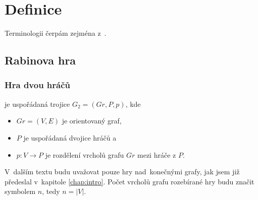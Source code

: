 \chapter{Definice} \label{chap:definitions}
Terminologii čerpám zejména z~\cite{Kretinsky2002,Horn2005,Piterman2006}.
\section{Rabinova hra}
\subsection{Hra dvou hráčů}
\begin{definition} \label{def:twoplayergame}
 je uspořádaná trojice $G_2 = (Gr, P, p)$, kde
\begin{itemize}
\item $Gr = (V, E)$ je orientovaný graf,
\item $P$ je uspořádaná dvojice hráčů a
\item $p: V \rightarrow P$ je rozdělení vrcholů grafu $Gr$ mezi hráče z $P$.
\end{itemize}
\end{definition}
V~dalším textu budu uvažovat pouze hry nad~konečnými grafy, jak jsem již předeslal v~kapitole \ref{chap:intro}. Počet vrcholů grafu rozebírané hry budu značit symbolem $n$, tedy $n = |V|$.

